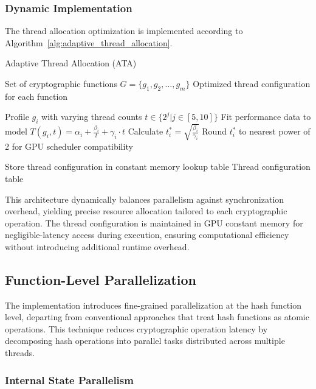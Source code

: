 \documentclass[journal]{IEEEtran}
\begin{document}
\subsubsection{Dynamic Implementation}

The thread allocation optimization is implemented according to Algorithm~\ref{alg:adaptive_thread_allocation}.


\begin{algorithm}
  \caption{Adaptive Thread Allocation (ATA)}
  \label{alg:adaptive_thread_allocation}
  \begin{algorithmic}[1]
    \REQUIRE Set of cryptographic functions $G = \{g_1, g_2, \ldots, g_m\}$
    \ENSURE Optimized thread configuration for each function

    \STATE Profile $g_i$ with varying thread counts $t \in \{2^j | j \in [5, 10]\}$
    \STATE Fit performance data to model $T(g_i, t) = \alpha_i + \frac{\beta_i}{t} + \gamma_i \cdot t$
    \STATE Calculate $t_i^* = \sqrt{\frac{\beta_i}{\gamma_i}}$
    \STATE Round $t_i^*$ to nearest power of 2 for GPU scheduler compatibility
    \ENDFOR

    \STATE Store thread configuration in constant memory lookup table
    \RETURN Thread configuration table
  \end{algorithmic}
\end{algorithm}

This architecture dynamically balances parallelism against synchronization overhead, yielding precise resource allocation tailored to each cryptographic operation. The thread configuration is maintained in GPU constant memory for negligible-latency access during execution, ensuring computational efficiency without introducing additional runtime overhead.

\subsection{Function-Level Parallelization}

The implementation introduces fine-grained parallelization at the hash function level, departing from conventional approaches that treat hash functions as atomic operations. This technique reduces cryptographic operation latency by decomposing hash operations into parallel tasks distributed across multiple threads.

\subsubsection{Internal State Parallelism}
\end{document}
